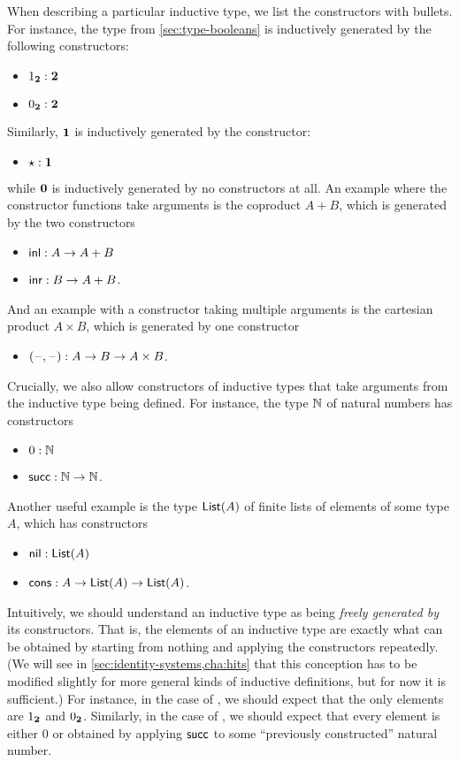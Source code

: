 When describing a particular inductive type, we list the constructors with bullets.
For instance, the type \bool from \autoref{sec:type-booleans} is inductively generated by the following constructors:
\begin{itemize}
\item ${1_{\mathbf{2}}}:\mathbf{2}$
\item ${0_{\mathbf{2}}}:\mathbf{2}$
\end{itemize}
Similarly, $\mathbf{1}$ is inductively generated by the constructor:
\begin{itemize}
\item $\star:\mathbf{1}$
\end{itemize}
while $\mathbf{0}$ is inductively generated by no constructors at all.
An example where the constructor functions take arguments is the coproduct $A+B$, which is generated by the two constructors
\begin{itemize}
\item ${\mathsf{inl}}:A\to A+B$
\item ${\mathsf{inr}}:B\to A+B$.
\end{itemize}
And an example with a constructor taking multiple arguments is the cartesian product $A\times B$, which is generated by one constructor
\begin{itemize}
\item ${\mathopen{}(\mathord{\hspace{1pt}\text{--}\hspace{1pt}}, \mathord{\hspace{1pt}\text{--}\hspace{1pt}})\mathclose{}} : A\to B \to A\times B$.
\end{itemize}
Crucially, we also allow constructors of inductive types that take arguments from the inductive type being defined.
For instance, the type $\mathbb{N}$ of natural numbers has constructors
\begin{itemize}
\item $0:\mathbb{N}$
\item $\mathsf{succ}:\mathbb{N}\to\mathbb{N}$.
\end{itemize}
%
%
Another useful example is the type $\mathsf{List}(A)$ of finite lists of elements of some type $A$, which has constructors
\begin{itemize}
\item $\mathsf{nil}:\mathsf{List}(A)$
\item $\mathsf{cons}:A\to \mathsf{List}(A) \to \mathsf{List}(A)$.
\end{itemize}

%
Intuitively, we should understand an inductive type as being \emph{freely generated by} its constructors.
That is, the elements of an inductive type are exactly what can be obtained by starting from nothing and applying the constructors repeatedly.
(We will see in \autoref{sec:identity-systems,cha:hits} that this conception has to be modified slightly for more general kinds of inductive definitions, but for now it is sufficient.)
For instance, in the case of \bool, we should expect that the only elements are ${1_{\mathbf{2}}}$ and ${0_{\mathbf{2}}}$.
Similarly, in the case of \nat, we should expect that every element is either $0$ or obtained by applying $\mathsf{succ}$ to some ``previously constructed'' natural number.

